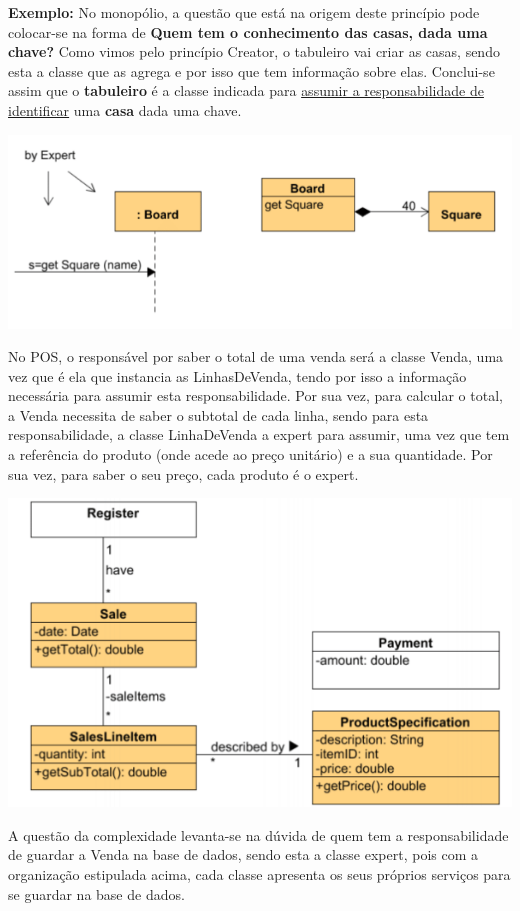 \documentclass{article}
\begin{document}
\begin{flushleft}
    \textbf{Exemplo:} No monopólio, a questão que está na origem deste princípio pode colocar-se na forma de \textbf{Quem tem o
    conhecimento das casas, dada uma chave?} Como vimos pelo princípio Creator, o tabuleiro vai criar as
    casas, sendo esta a classe que as agrega e por isso que tem informação sobre elas. Conclui-se assim que
    o \textbf{tabuleiro} é a classe indicada para \uline{assumir a responsabilidade de identificar} uma \textbf{casa} dada uma chave.

    \begin{center}
        \includegraphics[scale=0.4]{Images/12.png}
    \end{center}

    \pagebreak
    No POS, o responsável por saber o total de uma venda será a classe Venda, uma vez que é ela que
    instancia as LinhasDeVenda, tendo por isso a informação necessária para assumir esta responsabilidade.
    Por sua vez, para calcular o total, a Venda necessita de saber o subtotal de cada linha, sendo para esta
    responsabilidade, a classe LinhaDeVenda a expert para assumir, uma vez que tem a referência do
    produto (onde acede ao preço unitário) e a sua quantidade. Por sua vez, para saber o seu preço, cada
    produto é o expert.

    \begin{center}
        \includegraphics[scale=0.4]{Images/13.png}
    \end{center}

    A questão da complexidade levanta-se na dúvida de quem tem a responsabilidade de guardar a Venda na
    base de dados, sendo esta a classe expert, pois com a organização estipulada acima, cada classe
    apresenta os seus próprios serviços para se guardar na base de dados.
\end{flushleft}
\end{document}
